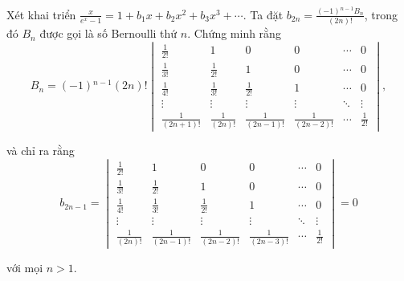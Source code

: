 \documentclass[class=nhvh-linear-algebra,crop=false]{standalone}
\begin{document}
\begin{exercise}
	\par Xét khai triển $\frac{x}{e^{x} - 1} = 1 + b_{1}x + b_{2}x^{2} + b_{3}x^{3} + \cdots$. Ta đặt $b_{2n} = \frac{(-1){}^{n-1}B_{n}}{(2n)!}$, trong đó $B_{n}$ được gọi là số Bernoulli thứ $n$. Chứng minh rằng
	\[
		B_{n} = (-1){}^{n-1}(2n)!
		\begin{vmatrix}
			\frac{1}{2!}      & 1               & 0                 & 0                 & \cdots & 0            \\
			\frac{1}{3!}      & \frac{1}{2!}    & 1                 & 0                 & \cdots & 0            \\
			\frac{1}{4!}      & \frac{1}{3!}    & \frac{1}{2!}      & 1                 & \cdots & 0            \\
			\vdots            & \vdots          & \vdots            & \vdots            & \ddots & \vdots       \\
			\frac{1}{(2n+1)!} & \frac{1}{(2n)!} & \frac{1}{(2n-1)!} & \frac{1}{(2n-2)!} & \cdots & \frac{1}{2!}
		\end{vmatrix},
	\]
	\par và chỉ ra rằng
	\[
		b_{2n-1} =
		\begin{vmatrix}
			\frac{1}{2!}    & 1                 & 0                 & 0                 & \cdots & 0            \\
			\frac{1}{3!}    & \frac{1}{2!}      & 1                 & 0                 & \cdots & 0            \\
			\frac{1}{4!}    & \frac{1}{3!}      & \frac{1}{2!}      & 1                 & \cdots & 0            \\
			\vdots          & \vdots            & \vdots            & \vdots            & \ddots & \vdots       \\
			\frac{1}{(2n)!} & \frac{1}{(2n-1)!} & \frac{1}{(2n-2)!} & \frac{1}{(2n-3)!} & \cdots & \frac{1}{2!}
		\end{vmatrix}
		= 0
	\]
	\par với mọi $n > 1$.
\end{exercise}
\end{document}
